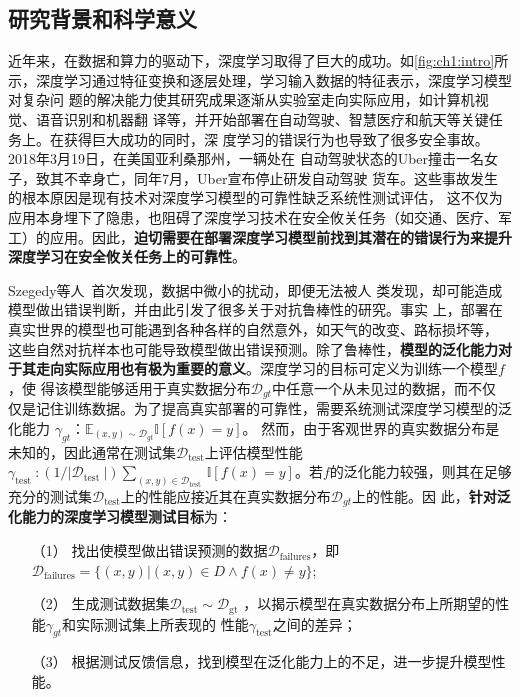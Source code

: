 
\subsection{研究背景和科学意义}



%
近年来，在数据和算力的驱动下，深度学习取得了巨大的成功。如\cref{fig:ch1:intro}所
示，深度学习通过特征变换和逐层处理，学习输入数据的特征表示，深度学习模型对复杂问
题的解决能力使其研究成果逐渐从实验室走向实际应用，如计算机视觉、语音识别和机器翻
译等，并开始部署在自动驾驶、智慧医疗和航天等关键任务上。在获得巨大成功的同时，深
度学习的错误行为也导致了很多安全事故。2018年3月19日，在美国亚利桑那州，一辆处在
自动驾驶状态的Uber撞击一名女子，致其不幸身亡，同年7月，Uber宣布停止研发自动驾驶
货车。这些事故发生的根本原因是现有技术对深度学习模型的可靠性缺乏系统性测试评估，
这不仅为应用本身埋下了隐患，也阻碍了深度学习技术在安全攸关任务（如交通、医疗、军
工）的应用。因此，\textbf{迫切需要在部署深度学习模型前找到其潜在的错误行为来提升
深度学习在安全攸关任务上的可靠性}。

Szegedy等人~\cite{szegedy2013intriguing}首次发现，数据中微小的扰动，即便无法被人
类发现，却可能造成模型做出错误判断，并由此引发了很多关于对抗鲁棒性的研究。事实
上，部署在真实世界的模型也可能遇到各种各样的自然意外，如天气的改变、路标损坏等，
这些自然对抗样本也可能导致模型做出错误预测。除了鲁棒性，\textbf{模型的泛化能力对
于其走向实际应用也有极为重要的意义}。深度学习的目标可定义为训练一个模型${f}$，使
得该模型能够适用于真实数据分布$\mathcal D_{gt}$中任意一个从未见过的数据，而不仅
仅是记住训练数据。为了提高真实部署的可靠性，需要系统测试深度学习模型的泛化能力
$\gamma_{gt}$：$\mathbb{E}_{(x, y) \sim \mathcal{D}_{g t}} \mathbb{I}[f(x)=y]$。
然而，由于客观世界的真实数据分布是未知的，因此通常在测试集$\mathcal
D_{\text{test}}$上评估模型性能$\gamma_{\text {test }}:\left(1 /\left|\mathcal
D_{\text {test }}\right|\right) \sum_{(x, y) \in \mathcal D_{\text {test }}}
\mathbb{I}[f(x)=y]$。若${f}$的泛化能力较强，则其在足够充分的测试集$\mathcal
D_{\text{test}}$上的性能应接近其在真实数据分布$\mathcal D_{gt}$上的性能。因
此，\textbf{针对泛化能力的深度学习模型测试目标}为：
\begin{itemize}
    \item[（1）] 找出使模型做出错误预测的数据$\mathcal D_{\text{failures}}$，即
    $\mathcal D_{\text{failures}}=\{(x, y) | (x, y) \in D \wedge f(x) \neq y\}$;
    \item[（2）] 生成测试数据集$\mathcal{D}_{\text{test}} \sim \mathcal{D}_{\text{gt}}$
    ，以揭示模型在真实数据分布上所期望的性能$\gamma_{gt}$和实际测试集上所表现的
    性能$\gamma_{\text{test}}$之间的差异；
    \item[（3）] 根据测试反馈信息，找到模型在泛化能力上的不足，进一步提升模型性能。
\end{itemize}

